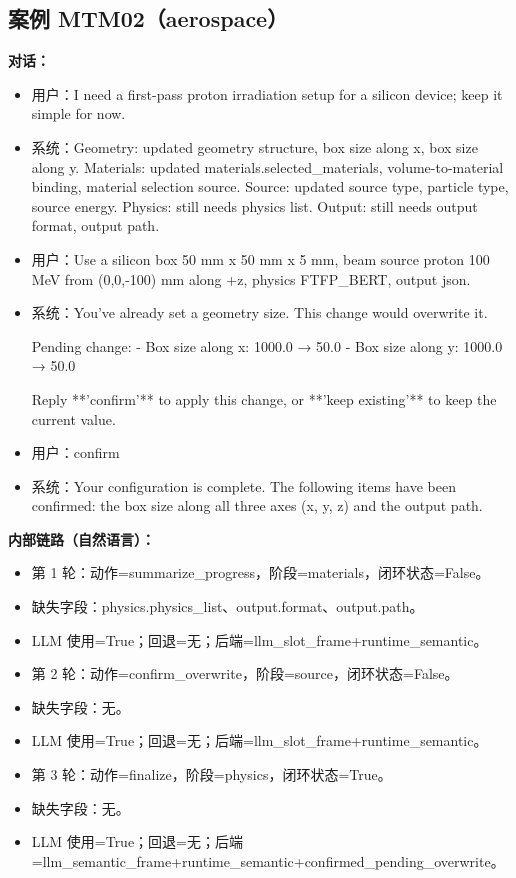 \documentclass[11pt]{ctexart}
\begin{document}
\subsection{案例 MTM02（aerospace）}
\textbf{对话：}
\begin{itemize}
\item 用户：I need a first-pass proton irradiation setup for a silicon device; keep it simple for now.
\item 系统：Geometry: updated geometry structure, box size along x, box size along y. Materials: updated materials.selected\_materials, volume-to-material binding, material selection source. Source: updated source type, particle type, source energy. Physics: still needs physics list. Output: still needs output format, output path.
\item 用户：Use a silicon box 50 mm x 50 mm x 5 mm, beam source proton 100 MeV from (0,0,-100) mm along +z, physics FTFP\_BERT, output json.
\item 系统：You've already set a geometry size. This change would overwrite it.

Pending change:
- Box size along x: 1000.0 → 50.0
- Box size along y: 1000.0 → 50.0

Reply **'confirm'** to apply this change, or **'keep existing'** to keep the current value.
\item 用户：confirm
\item 系统：Your configuration is complete. The following items have been confirmed: the box size along all three axes (x, y, z) and the output path.
\end{itemize}
\textbf{内部链路（自然语言）：}
\begin{itemize}
\item 第 1 轮：动作=summarize\_progress，阶段=materials，闭环状态=False。
\item 缺失字段：physics.physics\_list、output.format、output.path。
\item LLM 使用=True；回退=无；后端=llm\_slot\_frame+runtime\_semantic。
\item 第 2 轮：动作=confirm\_overwrite，阶段=source，闭环状态=False。
\item 缺失字段：无。
\item LLM 使用=True；回退=无；后端=llm\_slot\_frame+runtime\_semantic。
\item 第 3 轮：动作=finalize，阶段=physics，闭环状态=True。
\item 缺失字段：无。
\item LLM 使用=True；回退=无；后端=llm\_semantic\_frame+runtime\_semantic+confirmed\_pending\_overwrite。
\end{itemize}
\end{document}
